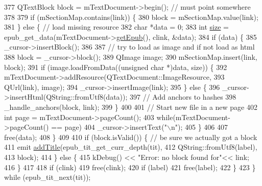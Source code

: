 \begin{DoxyCode}
{{377         QTextBlock block = mTextDocument->begin(); \textcolor{comment}{// must point somewhere}
378 
379         \textcolor{keywordflow}{if} (mSectionMap.contains(link)) \{
380           block = mSectionMap.value(link);
381         \} \textcolor{keywordflow}{else} \{ \textcolor{comment}{// load missing resource}
382           \textcolor{keywordtype}{char} *data = 0;
383           \textcolor{keywordtype}{int} \hyperlink{synctex__parser_8c_aa23c661441688350614bd6a350d2b6ff}{size} = epub\_get\_data(mTextDocument->\hyperlink{classEpub_1_1EpubDocument_a37cb6d97564a7764b22e44523889267e}{getEpub}(), clink, &data);
384           \textcolor{keywordflow}{if} (data) \{
385             \_cursor->insertBlock();
386 
387             \textcolor{comment}{// try to load as image and if not load as html}
388             block = \_cursor->block();
389             QImage image;
390             mSectionMap.insert(link, block);
391             \textcolor{keywordflow}{if} (image.loadFromData((\textcolor{keywordtype}{unsigned} \textcolor{keywordtype}{char} *)data, size)) \{
392               mTextDocument->addResource(QTextDocument::ImageResource,
393                                          QUrl(link), image);
394               \_cursor->insertImage(link);
395             \} \textcolor{keywordflow}{else} \{
396               \_cursor->insertHtml(QString::fromUtf8(data));
397               \textcolor{comment}{// Add anchors to hashes}
398               \_handle\_anchors(block, link);
399             \}
400 
401             \textcolor{comment}{// Start new file in a new page}
402             \textcolor{keywordtype}{int} page = mTextDocument->pageCount();
403             \textcolor{keywordflow}{while}(mTextDocument->pageCount() == page)
404               \_cursor->insertText(\textcolor{stringliteral}{"\(\backslash\)n"});
405           \}
406 
407           free(data);
408         \}
409 
410         \textcolor{keywordflow}{if} (block.isValid()) \{ \textcolor{comment}{// be sure we actually got a block}
411           emit \hyperlink{classOkular_1_1TextDocumentConverter_a054a6dbaad659387f26d239aa96d758d}{addTitle}(epub\_tit\_get\_curr\_depth(tit),
412                         QString::fromUtf8(label),
413                         block);
414         \} \textcolor{keywordflow}{else} \{
415           kDebug() << \textcolor{stringliteral}{"Error: no block found for"}<< link;
416         \}
417 
418         \textcolor{keywordflow}{if} (clink)
419           free(clink);
420         \textcolor{keywordflow}{if} (label)
421           free(label);
422       \}
423     \} \textcolor{keywordflow}{while} (epub\_tit\_next(tit));
}}
\end{DoxyCode}
